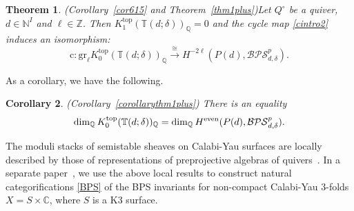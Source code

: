 \documentclass [11pt,oneside,a4paper,mathscr]{amsart}
\newtheorem{thm}{Theorem}[section]
\newtheorem{cor}[thm]{Corollary}
\theoremstyle{definition}
\begin{document}
\begin{thm}\emph{(Corollary~\ref{cor615} and Theorem~\ref{thm1plus})}\label{thmintro2}
Let $Q^\circ$ be a quiver, $d\in \mathbb{N}^I$ and $\ell \in \mathbb{Z}$. Then $K^{\mathrm{top}}_1(\mathbb{T}(d; \delta))_{\mathbb{Q}}=0$ and the cycle map \eqref{cintro2} induces an isomorphism:
\begin{equation}\label{m3}
   \mathrm{c}\colon \mathrm{gr}_\ell K^{\mathrm{top}}_0(\mathbb{T}(d; \delta))_{\mathbb{Q}}\stackrel{\cong}{\to} H^{-2\ell}(P(d), \mathcal{BPS}^p_{d, \delta}).
\end{equation}
\end{thm}
As a corollary, we have the following. 
\begin{cor}\emph{(Corollary~\ref{corollarythm1plus})}
\label{corintro2}
There is an equality 
\begin{align*}
    \dim_{\mathbb{Q}} K_0^{\rm{top}}(\mathbb{T}(d; \delta))_{\mathbb{Q}}
    =\dim_{\mathbb{Q}} H^{\rm{even}}(P(d), \mathcal{BPS}_{d, \delta}^p). 
\end{align*}
\end{cor}

The moduli stacks of semistable sheaves
on Calabi-Yau surfaces are locally described by
those of representations of preprojective algebras of quivers~\cite{Sacca0, DavPurity}.
In a separate paper~\cite{PTK3}, we use the above
local results 
to construct natural categorifications \eqref{BPS} of the BPS invariants for non-compact Calabi-Yau $3$-folds $X=S\times \mathbb{C}$, where $S$ is a K3 surface. 




\end{document}
